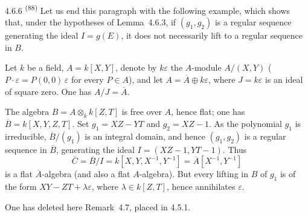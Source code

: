 \begin{remark}{4.6.6}
\label{III.4.6.6}
\textsuperscript{(88)}
Let us end this paragraph with the following example, which shows that, under the hypotheses of Lemma~4.6.3, if \((g_{1},g_{2})\) is a regular sequence generating the ideal \(I=g(E)\), it does not necessarily lift to a regular sequence in \(B\).

Let \(k\) be a field, \(A=k[X,Y]\), denote by \(k\varepsilon\) the \(A\)-module \(A/(X,Y)\) (\ie \(P\cdot\varepsilon=P(0,0)\,\varepsilon\) for every \(P\in A\)), and let \(A=\overline{A}\oplus k\varepsilon\), where \(J=k\varepsilon\) is an ideal of square zero. One has \(A/J=\overline{A}\).

The algebra \(B=A\otimes_{k}k[Z,T]\) is free over \(A\), hence flat; one has \(\overline{B}=k[X,Y,Z,T]\). Set \(g_{1}=XZ-YT\) and \(g_{2}=XZ-1\). As the polynomial \(g_{1}\) is irreducible, \(\overline{B}/(g_{1})\) is an integral domain, and hence \((g_{1},g_{2})\) is a regular sequence in \(\overline{B}\), generating the ideal \(I=(XZ-1,YT-1)\). Thus
\[
\overline{C}=\overline{B}/I=k[X,Y,X^{-1},Y^{-1}]=\overline{A}[X^{-1},Y^{-1}]
\]
is a flat \(\overline{A}\)-algebra (and also a flat \(A\)-algebra). But every lifting in \(B\) of \(g_{1}\) is of the form \(XY-ZT+\lambda\varepsilon\), where \(\lambda\in k[Z,T]\), hence annihilates \(\varepsilon\).
\end{remark}

\label{III.4.7}
One has deleted here Remark~4.7, placed in 4.5.1.

